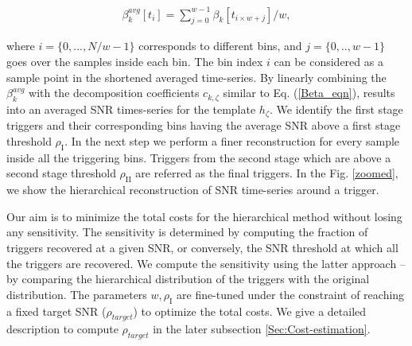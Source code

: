 \begin{align}
    \beta^{avg}_k [t_i] = \sum \limits_{j=0}^{w-1} \beta_k [t_{i\times w + j}] / w,
\end{align}

where $i = \{0,...,N/w-1\}$ corresponds to different bins, and $j = \{0,..,w-1\}$ goes over the samples inside each bin. The bin index $i$ can be considered as a sample point in the shortened averaged time-series. By linearly combining the $\beta^{avg}_k$ with the decomposition coefficients $c_{k, \zeta}$ similar to Eq. (\ref{Beta_eqn}), results into an averaged SNR times-series for the template $h_{\zeta}$. We identify the first stage triggers and their corresponding bins having the average SNR above a first stage threshold $\rho_{\text{I}}$. In the next step we perform a finer reconstruction for every sample inside all the triggering bins. Triggers from the second stage which are above a second stage threshold $\rho_{\text{II}}$ are referred as the final triggers. In the Fig. \ref{zoomed}, we show the hierarchical reconstruction of SNR time-series around a trigger.
 
Our aim is to minimize the total costs for the hierarchical method without losing any sensitivity. The sensitivity is determined by computing the fraction of triggers recovered at a given SNR, or conversely, the SNR threshold at which all the triggers are recovered. We compute the sensitivity using the latter approach -- by comparing the hierarchical distribution of the triggers with the original distribution. The parameters $w, \rho_{\text{I}}$ are fine-tuned under the constraint of reaching a fixed target SNR ($\rho_{target}$) to optimize the total costs. We give a detailed description to compute $\rho_{target}$ in the later subsection \ref{Sec:Cost-estimation}.


